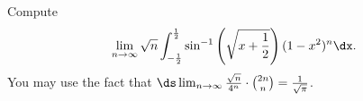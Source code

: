 Compute
\[
	\lim_{n\to\infty}\sqrt{n}\int_{-\frac{1}{2}}^{\frac{1}{2}}\sin^{-1}\left(\sqrt{x+\frac{1}{2}}\right)(1-x^2)^n\dx.
\]
You may use the fact that $\ds\lim_{n\to\infty}\frac{\sqrt{n}}{4^n}\cdot\binom{2n}{n}=\frac{1}{\sqrt{\pi}}$.
